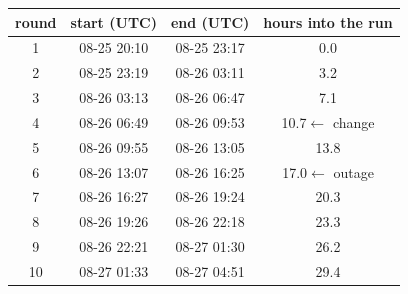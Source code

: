 \begin{tabular}{cccc}
\toprule
round & start (UTC) & end (UTC) & hours into the run \\
\midrule
1 & 08-25 20:10 & 08-25 23:17 & 0.0 \\
2 & 08-25 23:19 & 08-26 03:11 & 3.2 \\
3 & 08-26 03:13 & 08-26 06:47 & 7.1 \\
4 & 08-26 06:49 & 08-26 09:53 & 10.7\;$\leftarrow$ change \\
5 & 08-26 09:55 & 08-26 13:05 & 13.8 \\
6 & 08-26 13:07 & 08-26 16:25 & 17.0\;$\leftarrow$ outage \\
7 & 08-26 16:27 & 08-26 19:24 & 20.3 \\
8 & 08-26 19:26 & 08-26 22:18 & 23.3 \\
9 & 08-26 22:21 & 08-27 01:30 & 26.2 \\
10 & 08-27 01:33 & 08-27 04:51 & 29.4 \\
\bottomrule
\end{tabular}

